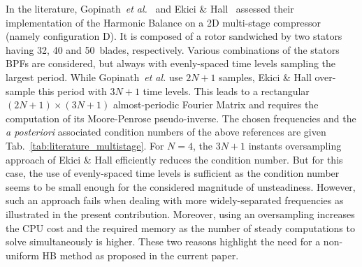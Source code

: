 In the literature, Gopinath~\emph{et al.}~\cite{gopinath2007three} and
Ekici \& Hall~\cite{Ekici2007} assessed their implementation of the
Harmonic Balance on a 2D multi-stage compressor (namely configuration
D). It is composed of a rotor sandwiched by two stators having
 32, 40 and 50~blades, respectively. Various combinations of the stators
BPFs are considered, but always with evenly-spaced time levels sampling the
largest period.  While Gopinath~\emph{et al.} use $2N+1$ samples,
Ekici \& Hall over-sample this period with $3N+1$ time levels. This
leads to a rectangular $(2N+1)\times(3N+1)$ almost-periodic Fourier
Matrix and requires the computation of its Moore-Penrose
pseudo-inverse. The chosen frequencies and the \emph{a posteriori}
associated condition numbers of the above references are given
Tab.~\ref{tab:literature_multistage}.  For $N=4$, the $3N+1$ instants
oversampling approach of Ekici \& Hall efficiently reduces the
condition number. But for this case, the use of evenly-spaced time
levels is sufficient as the condition number seems to be small enough
for the considered magnitude of unsteadiness.  However, such an
approach fails when dealing with more widely-separated frequencies as
illustrated in the present contribution. Moreover, using an oversampling increases
the CPU cost and the required memory as the number of steady computations
to solve simultaneously is higher. These two reasons highlight the
need for a non-uniform HB method as proposed in the current paper.
